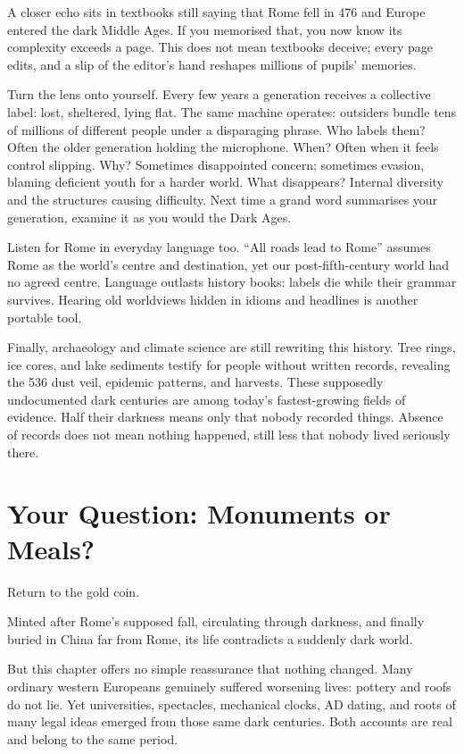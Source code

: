 A closer echo sits in textbooks still saying that Rome fell in 476 and Europe entered the dark Middle Ages. If you memorised that, you now know its complexity exceeds a page. This does not mean textbooks deceive; every page edits, and a slip of the editor's hand reshapes millions of pupils' memories.

Turn the lens onto yourself. Every few years a generation receives a collective label: lost, sheltered, lying flat. The same machine operates: outsiders bundle tens of millions of different people under a disparaging phrase. Who labels them? Often the older generation holding the microphone. When? Often when it feels control slipping. Why? Sometimes disappointed concern; sometimes evasion, blaming deficient youth for a harder world. What disappears? Internal diversity and the structures causing difficulty. Next time a grand word summarises your generation, examine it as you would the Dark Ages.

Listen for Rome in everyday language too. ``All roads lead to Rome'' assumes Rome as the world's centre and destination, yet our post-fifth-century world had no agreed centre. Language outlasts history books: labels die while their grammar survives. Hearing old worldviews hidden in idioms and headlines is another portable tool.

Finally, archaeology and climate science are still rewriting this history. Tree rings, ice cores, and lake sediments testify for people without written records, revealing the 536 dust veil, epidemic patterns, and harvests. These supposedly undocumented dark centuries are among today's fastest-growing fields of evidence. Half their darkness means only that nobody recorded things. Absence of records does not mean nothing happened, still less that nobody lived seriously there.

\section{Your Question: Monuments or Meals?}
Return to the gold coin.

Minted after Rome's supposed fall, circulating through darkness, and finally buried in China far from Rome, its life contradicts a suddenly dark world.

But this chapter offers no simple reassurance that nothing changed. Many ordinary western Europeans genuinely suffered worsening lives: pottery and roofs do not lie. Yet universities, spectacles, mechanical clocks, AD dating, and roots of many legal ideas emerged from those same dark centuries. Both accounts are real and belong to the same period.

